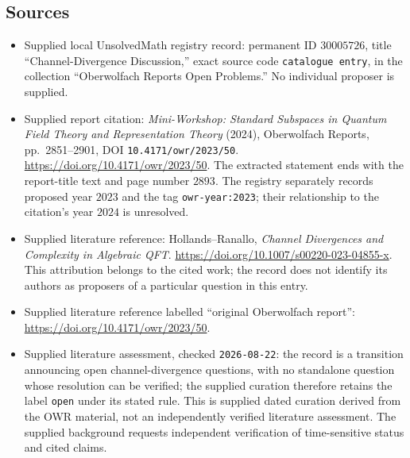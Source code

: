 \documentclass[11pt]{article}
\begin{document}
\subsection{Sources}
\begin{itemize}
\item Supplied local UnsolvedMath registry record: permanent ID \(30005726\), title ``Channel-Divergence Discussion,'' exact source code \texttt{catalogue entry}, in the collection ``Oberwolfach Reports Open Problems.'' No individual proposer is supplied.
\item Supplied report citation: \emph{Mini-Workshop: Standard Subspaces in Quantum Field Theory and Representation Theory} (2024), Oberwolfach Reports, pp.~2851--2901, DOI \texttt{10.4171/owr/2023/50}. \url{https://doi.org/10.4171/owr/2023/50}. The extracted statement ends with the report-title text and page number \(2893\). The registry separately records proposed year \(2023\) and the tag \texttt{owr-year:2023}; their relationship to the citation's year \(2024\) is unresolved.
\item Supplied literature reference: Hollands--Ranallo, \emph{Channel Divergences and Complexity in Algebraic QFT}. \url{https://doi.org/10.1007/s00220-023-04855-x}. This attribution belongs to the cited work; the record does not identify its authors as proposers of a particular question in this entry.
\item Supplied literature reference labelled ``original Oberwolfach report'': \url{https://doi.org/10.4171/owr/2023/50}.
\item Supplied literature assessment, checked \texttt{2026-08-22}: the record is a transition announcing open channel-divergence questions, with no standalone question whose resolution can be verified; the supplied curation therefore retains the label \texttt{open} under its stated rule. This is supplied dated curation derived from the OWR material, not an independently verified literature assessment. The supplied background requests independent verification of time-sensitive status and cited claims.
\end{itemize}
\end{document}
